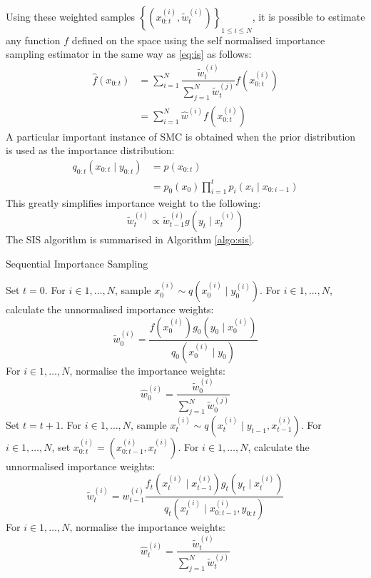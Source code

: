 Using these weighted samples $\left\{(x^{(i)}_{0:t}, \tilde{w}^{(i)}_t)\right\}_{1 \leq i \leq N}$, it is possible to estimate any function $f$ defined on the space using the self normalised importance sampling estimator in the same way as \eqref{eq:is} as follows:
\begin{align}
  \hat{f}(x_{0:t}) &= \sum^N_{i=1} \dfrac{\tilde{w}^{(i)}_t}{\sum^N_{j=1}\tilde{w}^{(j)}_t} f(x^{(i)}_{0:t}) \nonumber \\
   &= \sum^N_{i=1} \hat{w}^{(i)} f(x^{(i)}_{0:t})
\end{align}
A particular important instance of SMC is obtained when the prior distribution is used as the importance distribution:
\begin{align}
	q_{0:t}(x_{0:t} \mid y_{0:t}) &= p(x_{0:t}) \nonumber \\
	             &= p_0(x_0) \prod^t_{i=1} p_i(x_i \mid x_{0:i-1})
\label{eq:bf}
\end{align}
This greatly simplifies importance weight to the following:
\begin{equation}
  \tilde{w}^{(i)}_t \propto \tilde{w}^{(i)}_{t-1} g (y_t \mid x^{(i)}_{t}) 
\end{equation}
The SIS algorithm is summarised in Algorithm \ref{algo:sis}.

\begin{algorithm}
\caption{Sequential Importance Sampling}\label{algo:sis}
\begin{algorithmic}[1]
\State Set $t = 0$.
\State For $i \in 1, \ldots, N$, sample $x^{(i)}_0 \sim q(x^{(i)}_0 \mid y^{(i)}_0)$.
\State For $i \in 1, \ldots, N$, calculate the unnormalised importance weights:
\begin{equation*}
 \tilde{w}^{(i)}_0 = \dfrac{f(x_0^{(i)})g_0(y_0 \mid x^{(i)}_0)}{q_0(x^{(i)}_0 \mid y_0)}
\end{equation*}
\State For $i \in 1, \ldots, N$, normalise the importance weights:
\begin{equation*}
\hat{w}^{(i)}_0 = \dfrac{\tilde{w}^{(i)}_0}{\sum^N_{j=1} \tilde{w}^{(j)}_0}
\end{equation*}
\State Set $t = t + 1$.
\State For $i \in 1, \ldots, N$, sample $x^{(i)}_t \sim q(x^{(i)}_t \mid y_{t-1}, x^{(i)}_{t-1})$.
\State For $i \in 1, \ldots, N$, set $x^{(i)}_{0:t} = (x^{(i)}_{0:t-1}, x^{(i)}_t)$.
\State For $i \in 1, \ldots, N$, calculate the unnormalised importance weights:
\begin{equation*}
 \tilde{w}^{(i)}_t = w^{(i)}_{t-1} \dfrac{f_t(x^{(i)}_t \mid x^{(i)}_{t-1})g_t(y_t \mid x^{(i)}_t)}{q_t(x^{(i)}_t \mid x^{(i)}_{0:t-1}, y_{0:t})}
\end{equation*}
\State For $i \in 1, \ldots, N$, normalise the importance weights:
\begin{equation*}
\hat{w}^{(i)}_t = \dfrac{\tilde{w}^{(i)}_t}{\sum^N_{j=1} \tilde{w}^{(j)}_t}
\end{equation*}
\EndWhile
\EndFunction
\end{algorithmic}
\end{algorithm}

